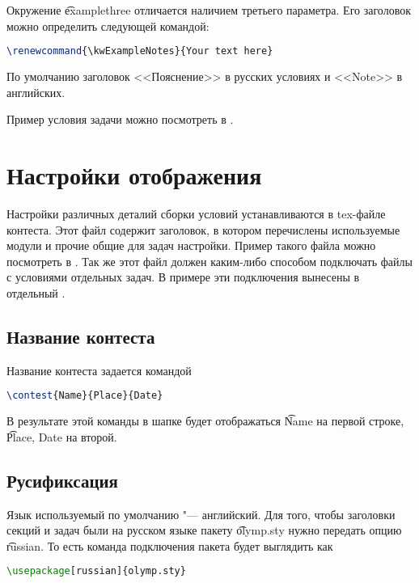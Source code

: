 \documentclass[11pt,a4paper,oneside]{article}
\begin{document}
Окружение \t{examplethree} отличается наличием третьего параметра.
Его заголовок можно определить следующей командой:
\begin{lstlisting}[language=tex]
\renewcommand{\kwExampleNotes}{Your text here}
\end{lstlisting}
По умолчанию заголовок <<Пояснение>> в русских условиях и <<Note>> в английских.

Пример условия задачи можно посмотреть в .

\newpage
\section{Настройки отображения}

Настройки различных деталий сборки условий устанавливаются в tex-файле контеста.
Этот файл содержит заголовок, в котором перечислены используемые модули и прочие 
общие для задач настройки. Пример такого файла можно посмотреть в 
.
Так же этот файл должен каким-либо способом подключать файлы с условиями отдельных задач.
В примере эти подключения вынесены в отдельный .

\subsection{Название контеста}

Название контеста задается командой 
\begin{lstlisting}[language=tex]
\contest{Name}{Place}{Date}
\end{lstlisting}

В результате этой команды в шапке будет отображаться \t{Name} на первой строке,
\t{Place, Date} на второй.

\subsection{Русификсация}

Язык используемый по умолчанию "--- английский. Для того, чтобы заголовки секций и задач были на
русском языке пакету \t{olymp.sty} нужно передать опцию \t{russian}. То есть 
команда подключения пакета будет выглядить как
\begin{lstlisting}[language=tex]
\usepackage[russian]{olymp.sty}
\end{lstlisting}
\end{document}
